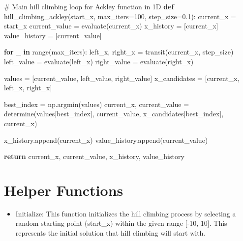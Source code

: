 \documentclass[
  letterpaper,
  DIV=11,
  numbers=noendperiod]{scrreprt}
\newenvironment{Shaded}{\begin{snugshade}}{\end{snugshade}}
\newcommand{\BuiltInTok}[1]{\textcolor[rgb]{0.00,0.23,0.31}{#1}}
\newcommand{\CommentTok}[1]{\textcolor[rgb]{0.37,0.37,0.37}{#1}}
\newcommand{\ControlFlowTok}[1]{\textcolor[rgb]{0.00,0.23,0.31}{\textbf{#1}}}
\newcommand{\DecValTok}[1]{\textcolor[rgb]{0.68,0.00,0.00}{#1}}
\newcommand{\FloatTok}[1]{\textcolor[rgb]{0.68,0.00,0.00}{#1}}
\newcommand{\KeywordTok}[1]{\textcolor[rgb]{0.00,0.23,0.31}{\textbf{#1}}}
\newcommand{\NormalTok}[1]{\textcolor[rgb]{0.00,0.23,0.31}{#1}}
\newcommand{\OperatorTok}[1]{\textcolor[rgb]{0.37,0.37,0.37}{#1}}
\providecommand{\tightlist}{%
  \setlength{\itemsep}{0pt}\setlength{\parskip}{0pt}}\usepackage{longtable,booktabs,array}
\begin{document}
\begin{Shaded}
\begin{Highlighting}[]
\CommentTok{\# Main hill climbing loop for Ackley function in 1D}
\KeywordTok{def}\NormalTok{ hill\_climbing\_ackley(start\_x, max\_iters}\OperatorTok{=}\DecValTok{100}\NormalTok{, step\_size}\OperatorTok{=}\FloatTok{0.1}\NormalTok{):}
\NormalTok{    current\_x }\OperatorTok{=}\NormalTok{ start\_x}
\NormalTok{    current\_value }\OperatorTok{=}\NormalTok{ evaluate(current\_x)}
\NormalTok{    x\_history }\OperatorTok{=}\NormalTok{ [current\_x]}
\NormalTok{    value\_history }\OperatorTok{=}\NormalTok{ [current\_value]}

    \ControlFlowTok{for}\NormalTok{ \_ }\KeywordTok{in} \BuiltInTok{range}\NormalTok{(max\_iters):}
\NormalTok{        left\_x, right\_x }\OperatorTok{=}\NormalTok{ transit(current\_x, step\_size)}
\NormalTok{        left\_value }\OperatorTok{=}\NormalTok{ evaluate(left\_x)}
\NormalTok{        right\_value }\OperatorTok{=}\NormalTok{ evaluate(right\_x)}

\NormalTok{        values }\OperatorTok{=}\NormalTok{ [current\_value, left\_value, right\_value]}
\NormalTok{        x\_candidates }\OperatorTok{=}\NormalTok{ [current\_x, left\_x, right\_x]}

\NormalTok{        best\_index }\OperatorTok{=}\NormalTok{ np.argmin(values)}
\NormalTok{        current\_x, current\_value }\OperatorTok{=}\NormalTok{ determine(values[best\_index], current\_value, x\_candidates[best\_index], current\_x)}

\NormalTok{        x\_history.append(current\_x)}
\NormalTok{        value\_history.append(current\_value)}

    \ControlFlowTok{return}\NormalTok{ current\_x, current\_value, x\_history, value\_history}
\end{Highlighting}
\end{Shaded}

\section{Helper Functions}\label{helper-functions-2}

\begin{itemize}
\tightlist
\item
  Initialize: This function initializes the hill climbing process by
  selecting a random starting point (start\_x) within the given range
  {[}-10, 10{]}. This represents the initial solution that hill climbing
  will start with.
\end{itemize}
\end{document}
